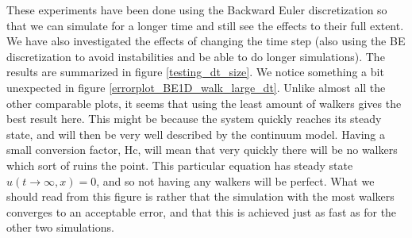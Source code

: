 These experiments have been done using the Backward Euler discretization so that we can simulate for a longer time and still see the effects to their full extent. 
We have also investigated the effects of changing the time step (also using the BE discretization to avoid instabilities and be able to do longer simulations). 
The results are summarized in figure \ref{testing_dt_size}. 
We notice something a bit unexpected in figure \ref{errorplot_BE1D_walk_large_dt}. 
Unlike almost all the other comparable plots, it seems that using the least amount of walkers gives the best result here. 
This might be because the system quickly reaches its steady state, and will then be very well described by the continuum model. 
Having a small conversion factor, Hc, will mean that very quickly there will be no walkers which sort of ruins the point. 
This particular equation has steady state $u(t\to\infty,x) = 0$, and so not having any walkers will be perfect. What we should read from this figure is rather that the simulation with the most walkers converges to an acceptable error, and that this is achieved just as fast as for the other two simulations.



